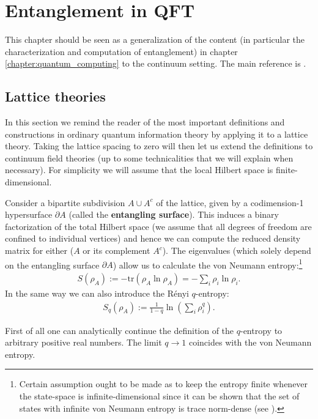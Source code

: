 \chapter{Entanglement in QFT}

    This chapter should be seen as a generalization of the content (in particular the characterization and computation of entanglement) in chapter \ref{chapter:quantum_computing} to the continuum setting. The main reference is \cite{entanglement_entropy, tuybens}.

\section{Lattice theories}

    In this section we remind the reader of the most important definitions and constructions in ordinary quantum information theory by applying it to a lattice theory. Taking the lattice spacing to zero will then let us extend the definitions to continuum field theories (up to some technicalities that we will explain when necessary). For simplicity we will assume that the local Hilbert space is finite-dimensional.

    Consider a bipartite subdivision $A\cup A^c$ of the lattice, given by a codimension-1 hypersurface $\partial A$ (called the \textbf{entangling surface}). This induces a binary factorization of the total Hilbert space (we assume that all degrees of freedom are confined to individual vertices) and hence we can compute the reduced density matrix for either ($A$ or its complement $A^c$). The eigenvalues (which solely depend on the entangling surface $\partial A$) allow us to calculate the von Neumann entropy:\footnote{Certain assumption ought to be made as to keep the entropy finite whenever the state-space is infinite-dimensional since it can be shown that the set of states with infinite von Neumann entropy is trace norm-dense (see \cite{Eisert_entropy}).}
    \begin{gather}
        S(\rho_A) := -\text{tr}(\rho_A\ln\rho_A) = -\sum_i\rho_i\ln\rho_i.
    \end{gather}
    In the same way we can also introduce the R\'enyi $q$-entropy:
    \begin{gather}
        S_q(\rho_A) := \frac{1}{1-q}\ln\left(\sum_i\rho_i^q\right).
    \end{gather}
    \begin{property}
     First of all one can analytically continue the definition of the $q$-entropy to arbitrary positive real numbers. The limit $q\rightarrow1$ coincides with the von Neumann entropy.
    \end{property}

